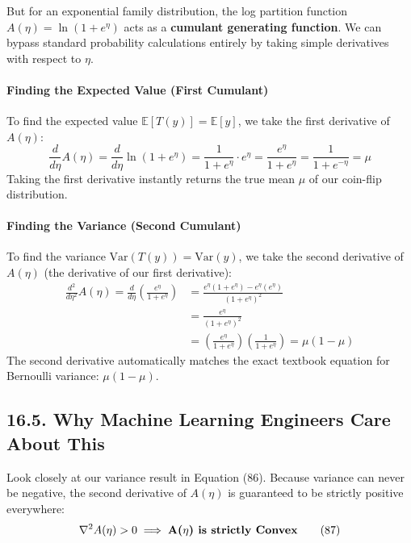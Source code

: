 \documentclass{article}
\begin{document}
But for an exponential family distribution, the log partition function $A(\eta) = \ln(1 + e^{\eta})$ acts as a \textbf{cumulant generating function}. We can bypass standard probability calculations entirely by taking simple derivatives with respect to $\eta$.

\paragraph{Finding the Expected Value (First Cumulant)}
To find the expected value $\mathbb{E}[T(y)] = \mathbb{E}[y]$, we take the first derivative of $A(\eta)$:
\begin{equation}
\frac{d}{d\eta} A(\eta) = \frac{d}{d\eta} \ln(1 + e^{\eta}) = \frac{1}{1 + e^{\eta}} \cdot e^{\eta} = \frac{e^{\eta}}{1 + e^{\eta}} = \frac{1}{1 + e^{-\eta}} = \mu \tag{85}
\end{equation}
Taking the first derivative instantly returns the true mean $\mu$ of our coin-flip distribution.

\paragraph{Finding the Variance (Second Cumulant)}
To find the variance $\text{Var}(T(y)) = \text{Var}(y)$, we take the second derivative of $A(\eta)$ (the derivative of our first derivative):
\begin{align}
\frac{d^2}{d\eta^2} A(\eta) = \frac{d}{d\eta} \left( \frac{e^{\eta}}{1 + e^{\eta}} \right) &= \frac{e^{\eta}(1 + e^{\eta}) - e^{\eta}(e^{\eta})}{(1 + e^{\eta})^2} \nonumber \\
&= \frac{e^{\eta}}{(1 + e^{\eta})^2} \nonumber \\
&= \left( \frac{e^{\eta}}{1 + e^{\eta}} \right) \left( \frac{1}{1 + e^{\eta}} \right) = \mu (1 - \mu) \tag{86}
\end{align}
The second derivative automatically matches the exact textbook equation for Bernoulli variance: $\mu(1-\mu)$.

\subsection*{16.5. Why Machine Learning Engineers Care About This}
Look closely at our variance result in Equation (86). Because variance can never be negative, the second derivative of $A(\eta)$ is guaranteed to be strictly positive everywhere:
\begin{equation}
\nabla^2 A(\eta) > 0 \implies \text{\textbf{A(\ensuremath{\eta}) is strictly Convex}} \tag{87}
\end{equation}
\end{document}
